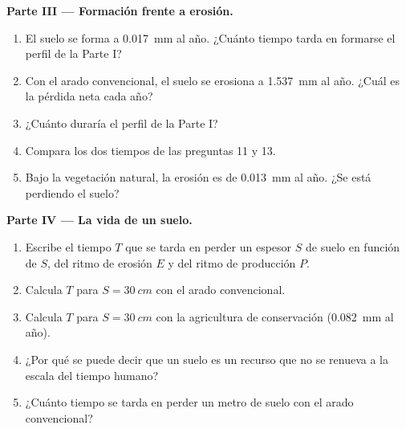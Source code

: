 \begin{problem}
\medskip
\noindent\textbf{Parte III --- Formación frente a erosión.}
\begin{enumerate}[resume]
  \item El suelo se forma a \qty{0.017}{mm} al año. ¿Cuánto tiempo tarda en
        formarse el perfil de la Parte I?
  \item Con el arado convencional, el suelo se erosiona a \qty{1.537}{mm} al
        año. ¿Cuál es la pérdida neta cada año?
  \item ¿Cuánto duraría el perfil de la Parte I?
  \item Compara los dos tiempos de las preguntas 11 y 13.
  \item Bajo la vegetación natural, la erosión es de \qty{0.013}{mm} al año.
        ¿Se está perdiendo el suelo?
\end{enumerate}

\medskip
\noindent\textbf{Parte IV --- La vida de un suelo.}
\begin{enumerate}[resume]
  \item Escribe el tiempo $T$ que se tarda en perder un espesor $S$ de suelo
        en función de $S$, del ritmo de erosión $E$ y del ritmo de producción
        $P$.
  \item Calcula $T$ para $S = \qty{30}{cm}$ con el arado convencional.
  \item Calcula $T$ para $S = \qty{30}{cm}$ con la agricultura de
        conservación (\qty{0.082}{mm} al año).
  \item ¿Por qué se puede decir que un suelo es un recurso que no se renueva
        a la escala del tiempo humano?
  \item ¿Cuánto tiempo se tarda en perder un metro de suelo con el arado
        convencional?
\end{enumerate}
\end{problem}
